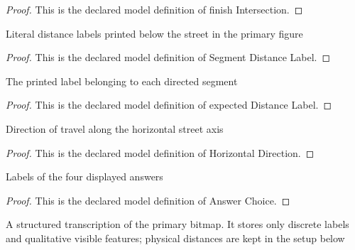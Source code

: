 \begin{proof}
  This is the declared model definition of finish Intersection.
\end{proof}
\begin{definition}
  \label{def:physics:phyx-mini-0732:phyxminiproblems-problemphyxmini0732-segmentdistancelabel}
  Literal distance labels printed below the street in the primary figure
\end{definition}
\begin{proof}
  This is the declared model definition of Segment Distance Label.
\end{proof}
\begin{definition}
  \label{def:physics:phyx-mini-0732:phyxminiproblems-problemphyxmini0732-streetsegment-expecteddistancelabel}
  The printed label belonging to each directed segment
\end{definition}
\begin{proof}
  This is the declared model definition of expected Distance Label.
\end{proof}
\begin{definition}
  \label{def:physics:phyx-mini-0732:phyxminiproblems-problemphyxmini0732-horizontaldirection}
  Direction of travel along the horizontal street axis
\end{definition}
\begin{proof}
  This is the declared model definition of Horizontal Direction.
\end{proof}
\begin{definition}
  \label{def:physics:phyx-mini-0732:phyxminiproblems-problemphyxmini0732-answerchoice}
  Labels of the four displayed answers
\end{definition}
\begin{proof}
  This is the declared model definition of Answer Choice.
\end{proof}
\begin{definition}
  \label{def:physics:phyx-mini-0732:phyxminiproblems-problemphyxmini0732-trafficcontrolfigure}
  A structured transcription of the primary bitmap. It stores only discrete labels and qualitative visible features; physical distances are kept in the setup below
\end{definition}
